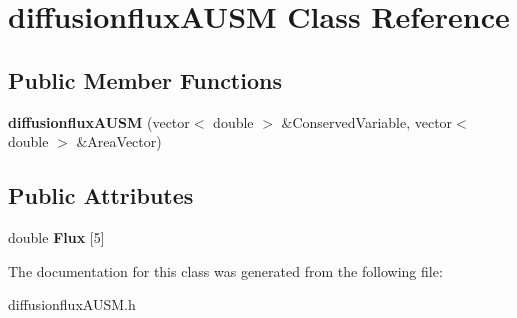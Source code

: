 \hypertarget{classdiffusionfluxAUSM}{}\section{diffusionflux\+A\+U\+SM Class Reference}
\label{classdiffusionfluxAUSM}
\subsection*{Public Member Functions}
\begin{DoxyCompactItemize}
\item 
{\bfseries diffusionflux\+A\+U\+SM} (vector$<$ double $>$ \&Conserved\+Variable, vector$<$ double $>$ \&Area\+Vector)\hypertarget{classdiffusionfluxAUSM_a8b268fcf5178b72c4fa71b9655c0464c}{}\label{classdiffusionfluxAUSM_a8b268fcf5178b72c4fa71b9655c0464c}

\end{DoxyCompactItemize}
\subsection*{Public Attributes}
\begin{DoxyCompactItemize}
\item 
double {\bfseries Flux} \mbox{[}5\mbox{]}\hypertarget{classdiffusionfluxAUSM_af39fcc75248a5e8c8820b1e8609857bc}{}\label{classdiffusionfluxAUSM_af39fcc75248a5e8c8820b1e8609857bc}

\end{DoxyCompactItemize}


The documentation for this class was generated from the following file\+:\begin{DoxyCompactItemize}
\item 
diffusionflux\+A\+U\+S\+M.\+h\end{DoxyCompactItemize}
